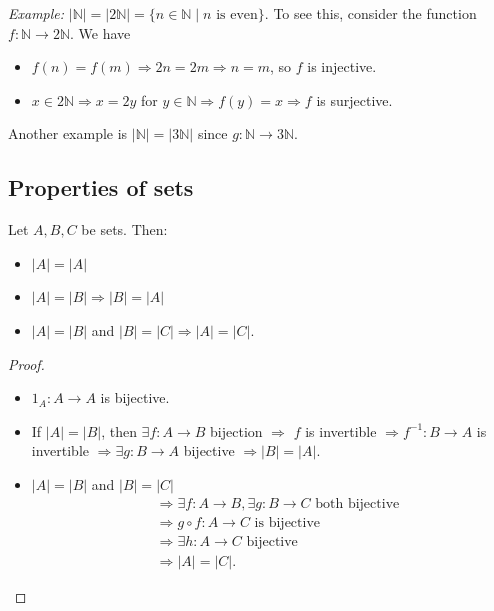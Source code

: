 \documentclass[11pt]{article}
\begin{document}
    \vspace{1em}

    \emph{Example:} \(|\mathbb{N}| = |2 \mathbb{N}| = \{n \in \mathbb{N} \mid \text{$n$ is even}\}\). To see this, consider the function \(f: \mathbb{N} \rightarrow 2 \mathbb{N}\). We have 
    \begin{itemize}
        \item \(f(n) = f(m) \Rightarrow 2n = 2m \Rightarrow n = m\), so $f$ is injective.
        \item \(x \in 2 \mathbb{N} \Rightarrow x = 2y\) for \(y \in \mathbb{N} \Rightarrow f(y) = x \Rightarrow f\) is surjective.
    \end{itemize}
    Another example is \(|\mathbb{N}| = |3 \mathbb{N}|\) since \(g: \mathbb{N} \rightarrow 3 \mathbb{N}\).

    \subsection{Properties of sets}

    Let \(A,B,C\) be sets. Then:
    \begin{itemize}
        \item \(|A| = |A|\)
        \item \(|A| = |B| \Rightarrow |B| = |A|\)
        \item \(|A| = |B|\) and \(|B| = |C| \Rightarrow |A| = |C|\).
    \end{itemize}

    \begin{proof}
        \begin{itemize}
            \item \(1_{A}: A \rightarrow A\) is bijective.
            \item If \(|A| = |B|\), then \(\exists f:A \rightarrow B\) bijection \(\Rightarrow\) $f$ is invertible \(\Rightarrow f^{-1}:B \rightarrow A\) is invertible \(\Rightarrow \exists g: B \rightarrow A\) bijective \(\Rightarrow |B| = |A|\).
            \item \(|A| = |B|\) and \(|B| = |C|\)
            \begin{align*}
                &\Rightarrow \exists f:A \rightarrow B, \exists g:B \rightarrow C \text{ both bijective} \\
                &\Rightarrow g \circ f:A \rightarrow C \text{ is bijective} \\
                &\Rightarrow \exists h:A \rightarrow C \text{ bijective} \\
                &\Rightarrow |A| = |C|.
            \end{align*} 
        \end{itemize}
    \end{proof}
\end{document}
